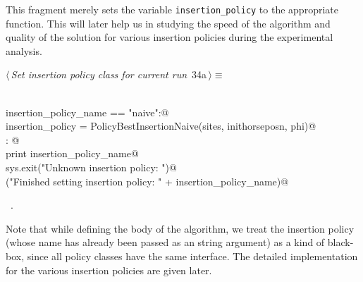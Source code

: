 \documentclass[11.5pt]{report}
\begin{document}

\vspace{-0.8cm}\newchunk This fragment merely sets the variable \verb|insertion_policy| to 
the appropriate function. This will later help us in studying the speed of 
the algorithm and quality of the solution for various insertion policies 
during the experimental analysis. 

\begin{flushleft} \small\label{scrap39}\raggedright\small
{} $\langle\,${\itshape Set insertion policy class for current run}\nobreak\ {\footnotesize {34a}}$\,\rangle\equiv$
\vspace{-1ex}
\begin{list}{}{} \item
\mbox{}\verb@@\\
\mbox{}\verb@if insertion_policy_name == "naive":@\\
\mbox{}\verb@     insertion_policy = PolicyBestInsertionNaive(sites, inithorseposn, phi)@\\
\mbox{}\verb@else: @\\
\mbox{}\verb@     print insertion_policy_name@\\
\mbox{}\verb@     sys.exit("Unknown insertion policy: ")@\\
\mbox{}\verb@debug("Finished setting insertion policy: " + insertion_policy_name)@\\
\mbox{}\verb@@{\NWsep}
\end{list}
\vspace{-1.5ex}
\footnotesize
\begin{list}{}{\setlength{\itemsep}{-\parsep}\setlength{\itemindent}{-\leftmargin}}
\item \NWtxtMacroRefIn\ .

\item{}
\end{list}
\vspace{4ex}
\end{flushleft}

\vspace{-0.8cm}\newchunk Note that while defining the body of the algorithm, we treat the insertion policy 
(whose name has already been passed as an string argument) as a kind of black-box, since all 
policy classes have the same interface. The detailed implementation for the various 
insertion policies are given later. 
\end{document}
